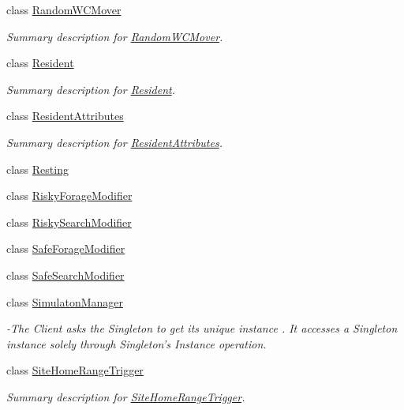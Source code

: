 \begin{DoxyCompactItemize}
class \hyperlink{class_p_a_z___dispersal_1_1_random_w_c_mover}{Random\-W\-C\-Mover}
\begin{DoxyCompactList}\small\item\em Summary description for \hyperlink{class_p_a_z___dispersal_1_1_random_w_c_mover}{Random\-W\-C\-Mover}. \end{DoxyCompactList}\item 
class \hyperlink{class_p_a_z___dispersal_1_1_resident}{Resident}
\begin{DoxyCompactList}\small\item\em Summary description for \hyperlink{class_p_a_z___dispersal_1_1_resident}{Resident}. \end{DoxyCompactList}\item 
class \hyperlink{class_p_a_z___dispersal_1_1_resident_attributes}{Resident\-Attributes}
\begin{DoxyCompactList}\small\item\em Summary description for \hyperlink{class_p_a_z___dispersal_1_1_resident_attributes}{Resident\-Attributes}. \end{DoxyCompactList}\item 
class \hyperlink{class_p_a_z___dispersal_1_1_resting}{Resting}
\item 
class \hyperlink{class_p_a_z___dispersal_1_1_risky_forage_modifier}{Risky\-Forage\-Modifier}
\item 
class \hyperlink{class_p_a_z___dispersal_1_1_risky_search_modifier}{Risky\-Search\-Modifier}
\item 
class \hyperlink{class_p_a_z___dispersal_1_1_safe_forage_modifier}{Safe\-Forage\-Modifier}
\item 
class \hyperlink{class_p_a_z___dispersal_1_1_safe_search_modifier}{Safe\-Search\-Modifier}
\item 
class \hyperlink{class_p_a_z___dispersal_1_1_simulaton_manager}{Simulaton\-Manager}
\begin{DoxyCompactList}\small\item\em -\/\-The Client asks the Singleton to get its unique instance . It accesses a Singleton instance solely through Singleton's Instance operation. \end{DoxyCompactList}\item 
class \hyperlink{class_p_a_z___dispersal_1_1_site_home_range_trigger}{Site\-Home\-Range\-Trigger}
\begin{DoxyCompactList}\small\item\em Summary description for \hyperlink{class_p_a_z___dispersal_1_1_site_home_range_trigger}{Site\-Home\-Range\-Trigger}. \end{DoxyCompactList}\item 

\end{DoxyCompactItemize}
